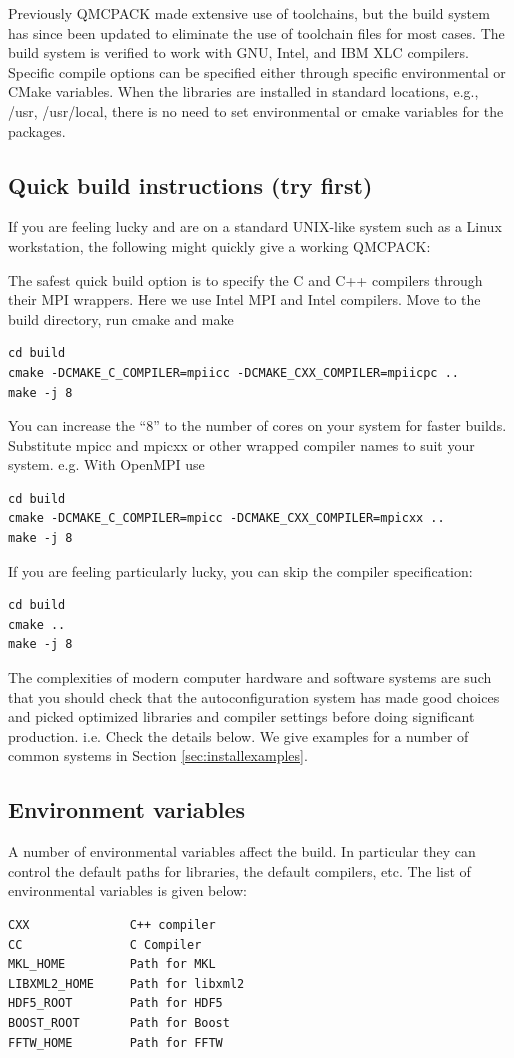 Previously QMCPACK made extensive use of toolchains, but the build system
has since been updated to eliminate the use of toolchain files for
most cases.  The build system is verified to work with GNU, Intel, and IBM XLC
compilers.  Specific compile options can be specified either through
specific environmental or CMake variables.  When the libraries are
installed in standard locations, e.g., /usr, /usr/local, there is no
need to set environmental or cmake variables for the packages.

\subsection{Quick build instructions (try first)}
\label{sec:cmakequick}

If you are feeling lucky and are on a standard UNIX-like system such
as a Linux workstation, the following might quickly give a
working QMCPACK:

The safest quick build option is to specify the C and C++ compilers
through their MPI wrappers. Here we use Intel MPI and Intel
compilers. Move to the build directory, run cmake and make
\begin{verbatim}
cd build
cmake -DCMAKE_C_COMPILER=mpiicc -DCMAKE_CXX_COMPILER=mpiicpc ..
make -j 8
\end{verbatim}
You can increase the ``8'' to the number of cores on your system for
faster builds. Substitute mpicc and mpicxx or other wrapped compiler names to suit
  your system. e.g. With OpenMPI use
\begin{verbatim}
cd build
cmake -DCMAKE_C_COMPILER=mpicc -DCMAKE_CXX_COMPILER=mpicxx ..
make -j 8
\end{verbatim}

If you are feeling particularly lucky, you can skip the compiler specification:
\begin{verbatim}
cd build
cmake ..
make -j 8
\end{verbatim}

The complexities of modern computer hardware and software systems are
such that you should check that the autoconfiguration system has made
good choices and picked optimized libraries and compiler settings
before doing significant production. i.e. Check the details below. We
give examples for a number of common systems in Section \ref{sec:installexamples}.

\subsection{Environment variables}
A number of environmental variables affect the build.  In particular
they can control the default paths for libraries, the default
compilers, etc.  The list of environmental variables is given below:
\begin{verbatim}
CXX              C++ compiler
CC               C Compiler
MKL_HOME         Path for MKL
LIBXML2_HOME     Path for libxml2
HDF5_ROOT        Path for HDF5
BOOST_ROOT       Path for Boost
FFTW_HOME        Path for FFTW
\end{verbatim}

